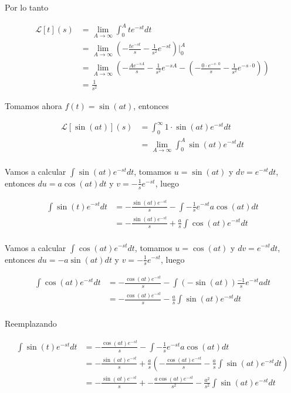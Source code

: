 \documentclass{article}
\theoremstyle{plain}
\theoremstyle{definition}
\begin{document}
Por lo tanto

\begin{align*}
\displaystyle \mathcal{L}[t](s) &= \lim_{A \to \infty} \int_0^A te^{-st} dt \\
&= \lim_{A \to \infty} \left( -\frac{te^{-st}}{s}- \frac{1}{s^2}e^{-st}  \right)\bigg|_0^A  \\
&= \lim_{A \to \infty} \left( -\frac{Ae^{-sA}}{s}- \frac{1}{s^2}e^{-sA}  -  \left( -\frac{0 \cdot e^{-s \cdot 0}}{s}- \frac{1}{s^2}e^{-s\cdot 0} \right) \right) \\
&= \frac{1}{s^2}
\end{align*}



Tomamos ahora $f(t) = \sin(at)$, entonces

\begin{align*}
\displaystyle \mathcal{L}[\sin(at)](s) &= \int_0^\infty 1 \cdot \sin(at)e^{-st} dt \\
&= \lim_{A \to \infty} \int_0^A \sin(at)e^{-st}  dt \\
\end{align*}

Vamos a calcular $\displaystyle \int \sin(at)e^{-st}dt$, tomamos $u=\sin(at)$ y $dv=e^{-st}dt$, entonces $du=a\cos(at)dt$ y $v=\displaystyle -\frac{1}{s}e^{-st}$, luego

\begin{align*}
\displaystyle \int \sin(t)e^{-st}dt &= -\frac{\sin(at)e^{-st}}{s}- \int -\frac{1}{s}e^{-st} a\cos(at)dt \\
&= -\frac{\sin(at)e^{-st}}{s}+ \frac{a}{s} \int \cos(at)e^{-st} dt\\
\end{align*}

Vamos a calcular $\displaystyle \int \cos(at)e^{-st}dt$, tomamos $u=\cos(at)$ y $dv=e^{-st}dt$, entonces $du=-a\sin(at)dt$ y $v=\displaystyle -\frac{1}{s}e^{-st}$, luego



\begin{align*}
\displaystyle \int \cos(at)e^{-st}dt &= -\frac{\cos(at)e^{-st}}{s}- \int (-\sin(at))\frac{-1}{s} e^{-st} adt \\
&= -\frac{\cos(at)e^{-st}}{s}- \frac{a}{s} \int \sin(at)e^{-st} dt\\
\end{align*}

Reemplazando

\begin{align*}
\displaystyle \int \sin(t)e^{-st}dt &= -\frac{\cos(at)e^{-st}}{s}- \int -\frac{1}{s}e^{-st} a\cos(at)dt \\
&= -\frac{\sin(at)e^{-st}}{s}+ \frac{a}{s} \left( -\frac{\cos(at)e^{-st}}{s}- \frac{a}{s} \int \sin(at)e^{-st} dt \right)  \\
&= -\frac{\sin(at)e^{-st}}{s}+  -\frac{a\cos(at)e^{-st}}{s^2}- \frac{a^2}{s^2} \int \sin(at)e^{-st} dt \\
\end{align*}
\end{document}
